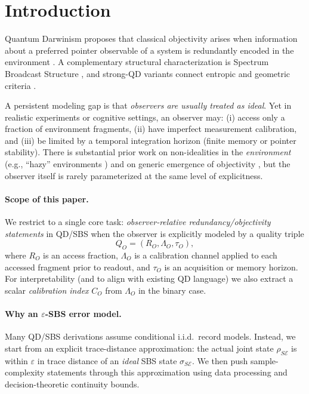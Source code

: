 \documentclass[11pt]{article}
\newcommand{\cE}{\mathcal{E}}
\newcommand{\1}{\mathbf{1}}
\theoremstyle{definition}
\theoremstyle{plain}
\begin{document}
\section{Introduction}

Quantum Darwinism proposes that classical objectivity arises when information about a preferred pointer observable of a system is redundantly encoded in the environment \citep{OPZ2004,Zurek2009,BlumeKohoutZurek2006}.
A complementary structural characterization is Spectrum Broadcast Structure \citep{HorodeckiKorbiczHorodecki2015,KorbiczReview2021}, and strong-QD variants connect entropic and geometric criteria \citep{LeOlayaCastro2019,KorbiczReview2021}.

A persistent modeling gap is that \emph{observers are usually treated as ideal}.
Yet in realistic experiments or cognitive settings, an observer may:
(i) access only a fraction of environment fragments,
(ii) have imperfect measurement calibration, and
(iii) be limited by a temporal integration horizon (finite memory or pointer stability).
There is substantial prior work on non-idealities in the \emph{environment} (e.g., ``hazy'' environments \citep{ZwolakQuanZurek2009}) and on generic emergence of objectivity \citep{BrandaoPianiHorodecki2015,Knott2018}, but the observer itself is rarely parameterized at the same level of explicitness.

\paragraph{Scope of this paper.}
We restrict to a single core task: \emph{observer-relative redundancy/objectivity statements} in QD/SBS when the observer is explicitly modeled by a quality triple
\[
Q_O=(R_O, \Lambda_O, \tau_O),
\]
where $R_O$ is an access fraction, $\Lambda_O$ is a calibration channel applied to each accessed fragment prior to readout, and $\tau_O$ is an acquisition or memory horizon.
For interpretability (and to align with existing QD language) we also extract a scalar \emph{calibration index} $C_O$ from $\Lambda_O$ in the binary case.

\paragraph{Why an $\varepsilon$-SBS error model.}
Many QD/SBS derivations assume conditional i.i.d.\ record models.
Instead, we start from an explicit trace-distance approximation:
the actual joint state $\rho_{S\cE}$ is within $\varepsilon$ in trace distance of an \emph{ideal} SBS state $\sigma_{S\cE}$.
We then push sample-complexity statements through this approximation using data processing and decision-theoretic continuity bounds.
\end{document}
